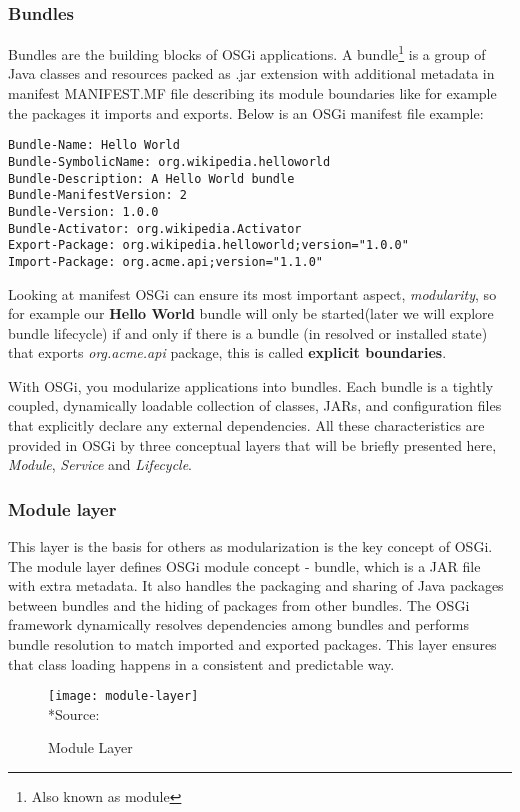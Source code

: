 \subsubsection{Bundles}
Bundles are the building blocks of OSGi applications. A bundle\footnote{Also known as module} is a group of Java classes and resources packed as .jar extension with additional metadata in manifest MANIFEST.MF file describing its module boundaries like for example the packages it imports and exports. Below is an OSGi manifest file example:

\begin{lstlisting}
Bundle-Name: Hello World
Bundle-SymbolicName: org.wikipedia.helloworld
Bundle-Description: A Hello World bundle
Bundle-ManifestVersion: 2
Bundle-Version: 1.0.0
Bundle-Activator: org.wikipedia.Activator
Export-Package: org.wikipedia.helloworld;version="1.0.0"
Import-Package: org.acme.api;version="1.1.0"
\end{lstlisting} 
\FloatBarrier

Looking at manifest OSGi can ensure its most important aspect, \emph{modularity}, so for example our \textbf{Hello World} bundle will only be started(later we will explore bundle lifecycle) if and only if there is a bundle (in resolved or installed state) that exports \emph{org.acme.api} package, this is called \textbf{explicit boundaries}.

With OSGi, you modularize applications into bundles. Each bundle is a tightly coupled, dynamically loadable collection of classes, JARs, and configuration files that explicitly declare any external dependencies. All these characteristics are provided in OSGi by three conceptual layers that will be briefly presented here, \emph{Module}, \emph{Service} and \emph{Lifecycle}.

\subsubsection{Module layer}
This layer is the basis for others as modularization is the key concept of OSGi. The module layer defines OSGi module concept - bundle, which is a JAR file with extra metadata. It also handles the packaging and sharing of Java packages between bundles and the hiding of packages from other bundles. The OSGi framework dynamically resolves dependencies among bundles and performs bundle resolution to match imported and exported packages. This layer ensures that class loading happens in a consistent and predictable way.

\begin{figure}[h]
\label{module layer}
\caption{Module Layer}
\centering
\texttt{[image: module-layer]}
\\*Source: \cite{conceptual layers 2011}
\end{figure}

